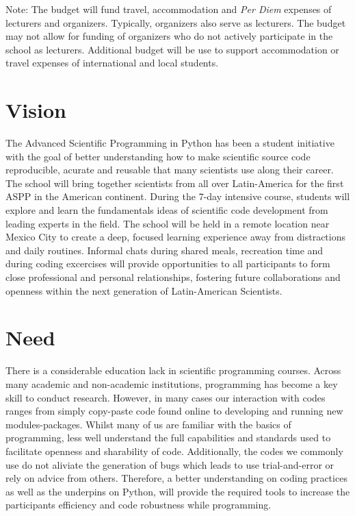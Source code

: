 \documentclass{article}[11pt]
\begin{document}
Note: The budget will fund travel, accommodation and \textit{Per Diem} expenses 
of lecturers and organizers. Typically, organizers also serve as lecturers. The 
budget may not allow for funding of organizers who do not actively participate 
in the school as lecturers. Additional budget will be use to support 
accommodation or travel expenses of international and local students.

\section*{Vision}
The Advanced Scientific Programming in Python has been a student initiative 
with the goal of better understanding how to make scientific source code 
reproducible, acurate and reusable that many scientists use along their career. 
The school will bring together scientists from all over Latin-America for the
first ASPP in the American continent. During the 7-day intensive course, 
students will explore and learn the fundamentals ideas of scientific code 
development from leading experts in the field. The school will be held in a 
remote location near Mexico City to create a deep, focused learning experience 
away from distractions and daily routines. Informal chats during shared meals, 
recreation time and during coding excercises will provide opportunities to all 
participants to form close professional and personal relationships, fostering 
future collaborations and openness within the next generation of Latin-American 
Scientists.

\section*{Need}
There is a considerable education lack in scientific programming courses. Across
many academic and non-academic institutions, programming has become a key skill
to conduct research. However, in many cases our interaction with codes ranges 
from simply copy-paste code found online to developing and running new modules-packages. 
Whilst many of us are familiar with the basics of programming, less well understand 
the full capabilities and standards used to facilitate openness and sharability of code. 
Additionally, the codes we commonly use do not aliviate the generation of bugs which 
leads to use trial-and-error or rely on advice from others. Therefore, a better 
understanding on coding practices as well as the underpins on Python, 
will provide the required tools to increase the participants efficiency and code 
robustness while programming.
\end{document}
